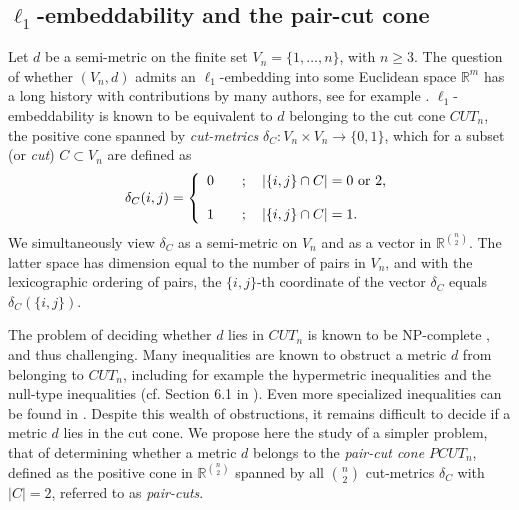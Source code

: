 \documentclass[12pt]{amsart}
\numberwithin{theorem}{section}
\theoremstyle{remark}
\begin{document}
\subsection{$\ell_1$-embeddability and the pair-cut cone} \label{Subsection on the ell1-embeddability and the pair-cut cone}
Let $d$ be a semi-metric on the finite set $V_n = \{1,\dots, n\}$, with $n\ge 3$. The question of whether $(V_n,d)$ admits an $\ell_1$-embedding into some Euclidean space $\mathbb R^m$ has a long history with contributions by many authors, see for example \cite{Blumenthal, Caley, DezaLaurentBook, Menger, Schoenberg}. $\ell_1$-embeddability is known to be equivalent to $d$ belonging to the cut cone $CUT_n$, the positive cone spanned by {\em cut-metrics} $\delta_C:V_n\times V_n\to\{0,1\}$, which for a subset (or {\em cut}) $C\subset V_n$ are defined as 
\begin{align} \label{Definition of cut semi-metric from introduction}
	\delta_C(i,j) = \left\{ 
	\begin{array}{cl} 
		0 &\quad ; \quad |\{i,j\}\cap C| = 0\text{ or } 2,  \cr
		& \cr 
		1 &\quad ; \quad |\{i,j\}\cap C| = 1.  
	\end{array} 
	\right. 
\end{align}
We simultaneously view $\delta_C$ as a semi-metric on $V_n$ and as a vector in $\mathbb R^{n\choose 2}$. The latter space has dimension equal to the number of pairs in $V_n$, and with the lexicographic ordering of pairs, the $\{i,j\}$-th coordinate of the vector $\delta_C$ equals $\delta_C(\{i,j\})$. 
 
The problem of deciding whether $d$ lies in $CUT_n$ is known to be NP-complete \cite{AvisDeza}, and thus challenging. Many inequalities are known to obstruct a metric $d$ from belonging to $CUT_n$, including for example the hypermetric inequalities and the null-type inequalities (cf. Section 6.1 in  \cite{DezaLaurentBook}). Even more specialized inequalities can be found in  \cite{DezaLaurant1, DezaLaurant2}. Despite this wealth of obstructions, it remains difficult to decide if a metric $d$ lies in the cut cone.  
\vskip3mm
We propose here the study of a simpler problem, that of determining whether a metric $d$ belongs to the {\em pair-cut cone $PCUT_n$}, defined as the positive cone in $\mathbb R^{n\choose 2}$ spanned by all ${n \choose 2}$ cut-metrics $\delta_C$ with $|C|=2$, referred to as {\em pair-cuts}. 
\end{document}

